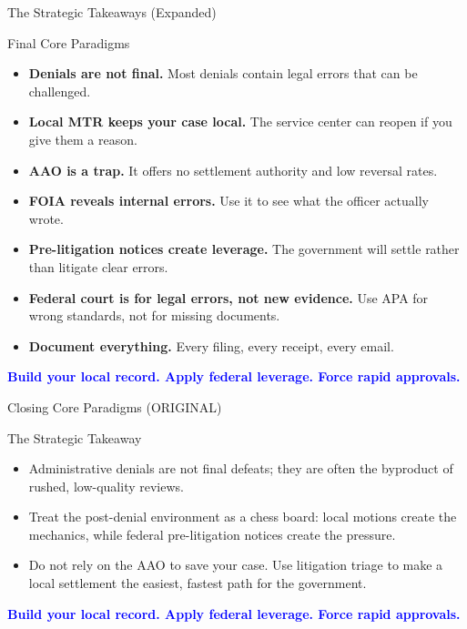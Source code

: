 \documentclass[11pt]{beamer}
\begin{document}
	\begin{frame}{The Strategic Takeaways (Expanded)}
		\scriptsize
		\begin{block}{Final Core Paradigms}
			\begin{itemize}
				\item \textbf{Denials are not final.} Most denials contain legal errors that can be challenged.
				\item \textbf{Local MTR keeps your case local.} The service center can reopen if you give them a reason.
				\item \textbf{AAO is a trap.} It offers no settlement authority and low reversal rates.
				\item \textbf{FOIA reveals internal errors.} Use it to see what the officer actually wrote.
				\item \textbf{Pre-litigation notices create leverage.} The government will settle rather than litigate clear errors.
				\item \textbf{Federal court is for legal errors, not new evidence.} Use APA for wrong standards, not for missing documents.
				\item \textbf{Document everything.} Every filing, every receipt, every email.
			\end{itemize}
			\vspace{0.3cm}
			\centering
			\textcolor{blue}{\textbf{Build your local record. Apply federal leverage. Force rapid approvals.}}
		\end{block}
	\end{frame}
	
	\begin{frame}{Closing Core Paradigms (ORIGINAL)}
		\scriptsize
		\begin{block}{The Strategic Takeaway}
			\begin{itemize}
				\item Administrative denials are not final defeats; they are often the byproduct of rushed, low-quality reviews.
				\item Treat the post-denial environment as a chess board: local motions create the mechanics, while federal pre-litigation notices create the pressure.
				\item Do not rely on the AAO to save your case. Use litigation triage to make a local settlement the easiest, fastest path for the government.
			\end{itemize}
			\vspace{0.3cm}
			\centering
			\textcolor{blue}{\textbf{Build your local record. Apply federal leverage. Force rapid approvals.}}
		\end{block}
	\end{frame}
	
\end{document}
